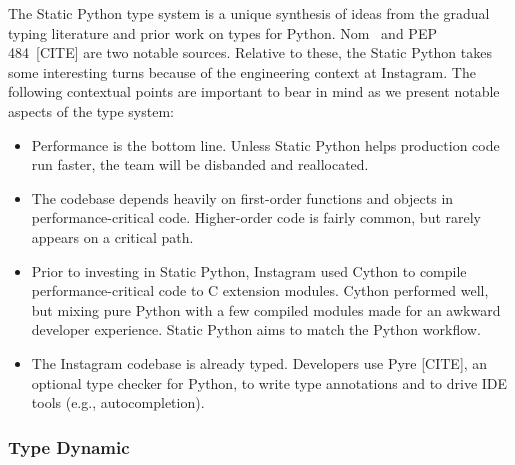\documentclass[english,cleveref,submission]{programming}
\newcommand{\SP}{Static Python}
\begin{document}
The \SP{} type system is a unique synthesis of ideas from the gradual typing literature
and prior work on types for Python.
Nom~\cite{mt-oopsla-2017,mt-oopsla-2021} and PEP 484~[CITE] are two notable sources.
Relative to these, the \SP{} takes some interesting turns
because of the engineering context at Instagram.
The following contextual points are important to bear in mind as we present
notable aspects of the type system:
\begin{itemize}
  \item
    Performance is the bottom line.
    Unless \SP{} helps production code run faster, the team will be disbanded
    and reallocated.
  \item
    The codebase depends heavily on first-order functions and objects in
    performance-critical code.
    Higher-order code is fairly common, but rarely appears on a critical path.
  \item
    Prior to investing in \SP{}, Instagram used Cython to compile
    performance-critical code to C extension modules.
    Cython performed well, but mixing pure Python with a few compiled modules
    made for an awkward developer experience.
    \SP{} aims to match the Python workflow.
  \item
    The Instagram codebase is already typed.
    Developers use Pyre [CITE], an optional type checker for Python,
    to write type annotations and to drive IDE tools (e.g., autocompletion).
\end{itemize}



\subsubsection{Type Dynamic}
\label{s:type-dynamic}

\end{document}
